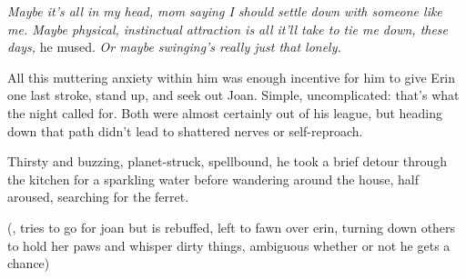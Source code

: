 \emph{Maybe it's all in my head, mom saying I should settle down with someone like me. Maybe physical, instinctual attraction is all it'll take to tie me down, these days,} he mused. \emph{Or maybe swinging's really just that lonely.}

All this muttering anxiety within him was enough incentive for him to give Erin one last stroke, stand up, and seek out Joan. Simple, uncomplicated: that's what the night called for. Both were almost certainly out of his league, but heading down that path didn't lead to shattered nerves or self-reproach.

Thirsty and buzzing, planet-struck, spellbound, he took a brief detour through the kitchen for a sparkling water before wandering around the house, half aroused, searching for the ferret.

(, tries to go for joan but is rebuffed, left to fawn over erin, turning down others to hold her paws and whisper dirty things, ambiguous whether or not he gets a chance)
